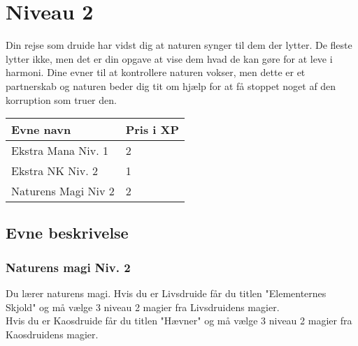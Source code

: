 \chapter{Niveau 2}

Din rejse som druide har vidst dig at naturen synger til dem der lytter. De fleste lytter ikke, men det er din opgave at vise dem hvad de kan gøre for at leve i harmoni. Dine evner til at kontrollere naturen vokser, men dette er et partnerskab og naturen beder dig tit om hjælp for at få stoppet noget af den korruption som truer den.

\begin{table}[H]
    \centering
    \begin{tabular}{|p{}|p{}|}
    \rowcolor{cerulean!80}\hline
        Evne navn & Pris i XP \\\hline
        Ekstra Mana Niv. 1 & 2\\\hline
        Ekstra NK Niv. 2 & 1\\\hline
        Naturens Magi Niv 2 & 2\\\hline
    \end{tabular}
\end{table}
\section{Evne beskrivelse}





\subsection{Naturens magi Niv. 2}
Du lærer naturens magi. Hvis du er Livsdruide får du titlen "Elementernes Skjold" og må vælge 3 niveau 2 magier fra Livsdruidens magier.\\ Hvis du er Kaosdruide får du titlen "Hævner" og må vælge 3 niveau 2 magier fra Kaosdruidens magier.\\